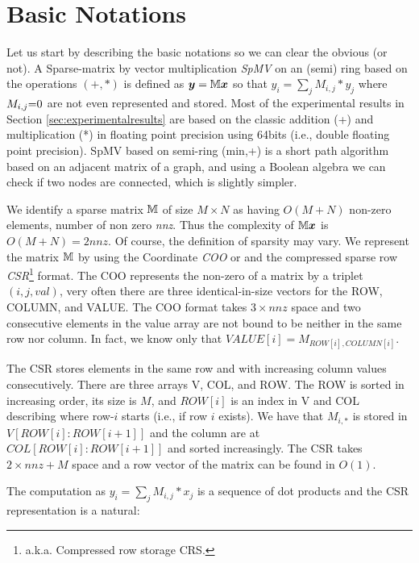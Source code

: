 \documentclass[manuscript,screen]{acmart}
\begin{document}
\section{Basic Notations}
\label{sec:notations}
Let us start by describing the basic notations so we can clear the
obvious (or not).  A Sparse-matrix by vector multiplication {\em SpMV}
on an (semi) ring based on the operations $(+,*)$ is defined as
${\boldsymbol y} = \mathbb{M} {\boldsymbol x}$ so that $y_i = \sum_j M_{i,j}*y_j$ where $M_{i,j}
{=} 0$ are not even represented and stored. Most of the experimental
results in Section \ref{sec:experimentalresults} are based on the
classic addition (+) and multiplication (*) in floating point
precision using 64bits (i.e., double floating point precision).  SpMV
based on semi-ring (min,+) is a short path algorithm based on an
adjacent matrix of a graph, and using a Boolean algebra we can check
if two nodes are connected, which is slightly simpler.

We identify a sparse matrix $\mathbb{M}$ of size $M\times N$ as having
$O(M+N)$ non-zero elements, number of non zero {\em nnz}. Thus the
complexity of $\mathbb{M} {\boldsymbol x}$ is $O(M+N) = 2nnz$. Of course, the
definition of sparsity may vary. We represent the matrix $\mathbb{M}$ by using
the Coordinate {\em COO} or and the compressed sparse row {\em
  CSR}\footnote{a.k.a. Compressed row storage {\rm CRS}.}  format. The
COO represents the non-zero of a matrix by a triplet $(i,j,val)$, very
often there are three identical-in-size vectors for the ROW, COLUMN,
and VALUE. The COO format takes $3\times nnz$ space and two
consecutive elements in the value array are not bound to be neither in
the same row nor column. In fact, we know only that $VALUE[i] =
M_{ROW[i],COLUMN[i]}$.

The CSR stores elements in the same row and with increasing column
values consecutively. There are three arrays V, COL, and ROW. The ROW
is sorted in increasing order, its size is $M$, and $ROW[i]$ is an
index in V and COL describing where row-$i$ starts (i.e., if row $i$
exists).  We have that $M_{i,*}$ is stored in $V[ROW[i]:ROW[i+1]]$ and
the column are at $COL[ROW[i]:ROW[i+1]]$ and sorted increasingly. The
CSR takes $2\times nnz + M$ space and a row vector of the matrix can
be found in $O(1)$.
 
The computation as $y_i = \sum_j M_{i,j}*x_j$ is a sequence of dot
products and the CSR representation is a natural:
\end{document}

